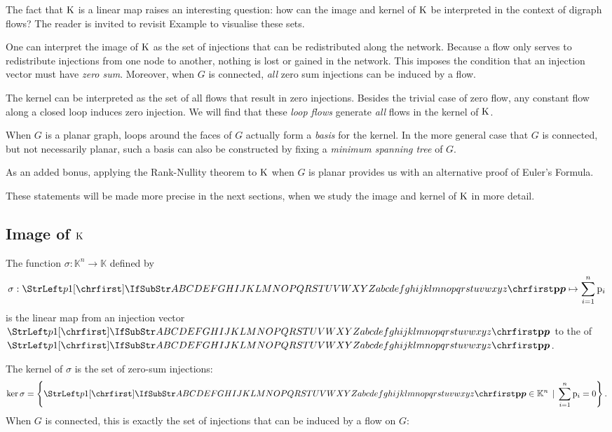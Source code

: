 \documentclass[main.tex]{subfiles}
\begin{document}
The fact that $\text{\textup{K}}$ is a linear map raises an interesting question: how can the image and kernel of $\text{\textup{K}}$ be interpreted in the context of digraph flows?
The reader is invited to revisit Example  to visualise these sets.

One can interpret the image of $\text{\textup{K}}$ as the set of injections that can be redistributed along the network. Because a flow only serves to redistribute injections from one node to another, nothing is lost or gained in the network. This imposes the condition that an injection vector must have \emph{zero sum}. Moreover, when $G$ is connected, \emph{all} zero sum injections can be induced by a flow.

The kernel can be interpreted as the set of all flows that result in zero injections. Besides the trivial case of zero flow, any constant flow along a closed loop induces zero injection. We will find that these \emph{loop flows} generate \emph{all} flows in the kernel of $\text{\textup{K}}$.

When $G$ is a planar graph, loops around the faces of $G$ actually form a \emph{basis} for the kernel. In the more general case that $G$ is connected, but not necessarily planar, such a basis can also be constructed by fixing a \emph{minimum spanning tree} of $G$.

As an added bonus, applying the Rank-Nullity theorem to $\text{\textup{K}}$ when $G$ is planar provides us with an alternative proof of Euler's Formula.

These statements will be made more precise in the next sections, when we study the image and kernel of $\text{\textup{K}}$ in more detail.

\subsection{Image of $\mathbf{\text{\textup{K}}}$}
\begin{definition}
The function $\sigma : \mathbb{K}^n \rightarrow \mathbb{K}$ defined by
\begin{gather*}
    \sigma : \mat{p} \mapsto \sum_{i=1}^n \mel{p}_i
\end{gather*}
is the linear map from an injection vector $\mat{p}$ to the  of $\mat{p}$.
\end{definition}
The kernel of $\sigma$ is the set of zero-sum injections:
$$\ker \sigma = \left\{ \mat{p} \in \mathbb{K}^n \, \mid \, \sum_{i=1}^n \mel{p}_i = 0 \right\}.$$
When $G$ is connected, this is exactly the set of injections that can be induced by a flow on $G$:
\end{document}
